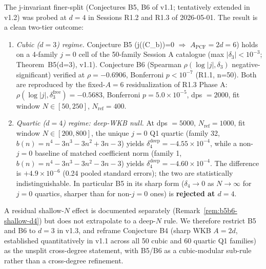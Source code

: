 %

\begin{remark}\label{rem:b5b6-degree-stratification-r13}
The j-invariant finer-split (Conjectures B5, B6 of v1.1; tentatively
extended in v1.2) was probed at $d=4$ in Sessions R1.2 and R1.3
of 2026-05-01. The result is a clean two-tier outcome:
\begin{enumerate}
  \item \textit{Cubic ($d=3$) regime.}\;\;
        Conjecture B5 (j((C_b))=0 $\Rightarrow$
        $A_{\mathrm{PCF}}=2d=6$) holds on a 4-family $j=0$ cell of
        the 50-family Session A catalogue (max $|\delta_3|<10^{-3}$;
        Theorem~B5(d=3), v1.1). Conjecture B6 (Spearman
        $\rho(\log|j|, \delta_3)$ negative-significant) verified
        at $\rho=-0.6906$, Bonferroni $p<10^{-7}$ (R1.1, n=50). Both
        are reproduced by the fixed-$A=6$ residualization of R1.3
        Phase A: $\rho(\log|j|,\delta^{\mathrm{free}}_3) = -0.5683$,
        Bonferroni $p=5.0\times 10^{-5}$, dps $=2000$, fit window
        $N\in[50,250]$, $N_{\mathrm{ref}}=400$.
  \item \textit{Quartic ($d=4$) regime: deep-WKB null.}\;\;
        At dps $=5000$, $N_{\mathrm{ref}}=1000$, fit window
        $N\in[200,800]$, the unique $j=0$ Q1 quartic (family 32,
        $b(n)=n^4-3n^3-3n^2+3n-3$) yields
        $\delta^{\mathrm{deep}}_4 = -4.55\times 10^{-4}$, while a
        non-$j=0$ baseline of matched coefficient norm (family 1,
        $b(n)=n^4-3n^3-3n^2-3n-3$) yields
        $\delta^{\mathrm{deep}}_4 = -4.60\times 10^{-4}$.  The
        difference is $+4.9\times 10^{-6}$ (0.24 pooled standard
        errors); the two are statistically indistinguishable.  In
        particular B5 in its sharp form ($\delta_4\to 0$ as
        $N\to\infty$ for $j=0$ quartics, sharper than for non-$j=0$
        ones) is \textbf{rejected at $d=4$}.
\end{enumerate}

A residual shallow-$N$ effect is documented separately
(Remark~\ref{rem:b5b6-shallow-d4}) but does not extrapolate to a
deep-$N$ rule.  We therefore restrict B5 and B6 to $d=3$ in v1.3,
and reframe Conjecture B4 (sharp WKB $A=2d$, established
quantitatively in v1.1 across all 50 cubic and 60 quartic Q1
families) as the unsplit cross-degree statement, with B5/B6 as a
cubic-modular sub-rule rather than a cross-degree refinement.
\end{remark}

